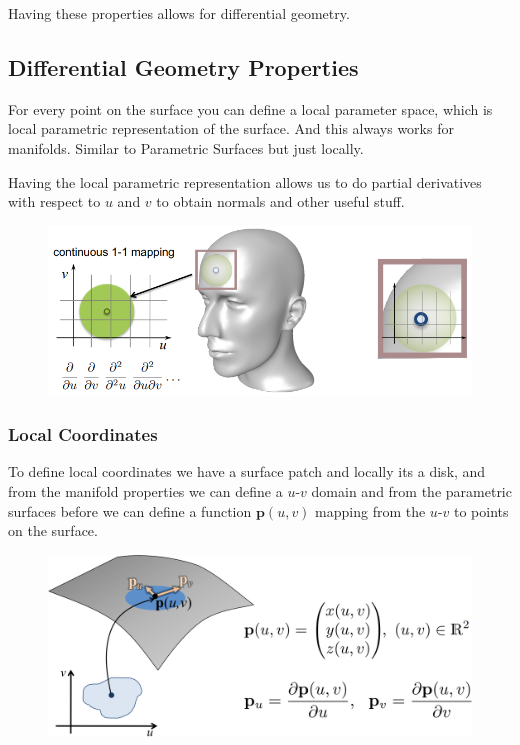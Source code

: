\documentclass{article}
\begin{document}
Having these properties allows for differential geometry.

\newpage
\subsection{Differential Geometry Properties}

For every point on the surface you can define  a local parameter space, which is local parametric
representation of the surface. And this always works for manifolds. Similar to Parametric Surfaces
but just locally.

\vspace{5px}

Having the local parametric representation allows us to do partial derivatives with respect to \(u\) and \(v\)
to obtain normals and other useful stuff.

\begin{figure}[!ht]
    \centering
    \includegraphics[width=0.6\linewidth]{images/local_observations.png}
\end{figure}


\subsubsection{Local Coordinates}

To define local coordinates we have a surface patch and locally its a disk, and from the manifold properties we
can define a \(u\)-\(v\) domain and from the parametric surfaces before we can define a function 
\(\mathbf{p}(u,v)\) mapping from the \(u\)-\(v\) to points on the surface.

\begin{figure}[!ht]
    \centering
    \includegraphics[width=0.7\linewidth]{images/local_coords.png}
\end{figure}
\end{document}
